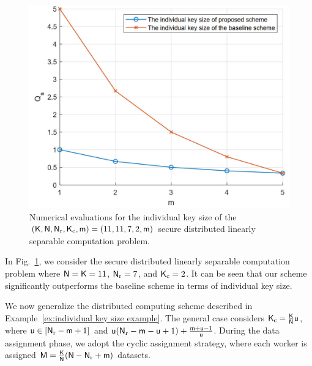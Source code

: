 \documentclass[conference,letterpaper]{IEEEtran}
\begin{document}
\begin{figure}%
\centerline{\includegraphics[scale=0.33]{compare}}
\caption{\small Numerical evaluations for the individual key size of the $({\sf K}, {\sf N}, {\sf N}_{\rm r}, {\sf K}_{\rm c}, {\sf m}) = (11, 11, 7, 2, {\sf m})$ secure distributed linearly separable computation problem.}
\label{fig: compare}
\end{figure}

In Fig.~\ref{fig: compare}, we consider the secure distributed linearly separable computation problem where ${\sf N} = {\sf K} = 11$, ${\sf N}_{\rm r} = 7$, and ${\sf K}_{\rm c}=2$.
It can be seen that our scheme significantly outperforms the baseline scheme in terms of individual key size.


We now generalize the distributed computing scheme described in Example~\ref{ex:individual key size example}. The general case considers ${\sf K}_{\rm c}= \frac{{\sf K}}{{\sf N}} {\sf u}$, where ${\sf u} \in [{\sf N}_{\rm r}-{\sf m}+1]$ and ${\sf u} ({\sf N}_{\rm r}-{\sf m}-{\sf u}+1) + \frac{{\sf m}+{\sf u}-1}{{\sf u}}$. 
During the data assignment phase, we adopt the cyclic assignment strategy, where each worker is assigned ${\sf M} = \frac{{\sf K}}{{\sf N}} ({\sf N} - {\sf N}_{\rm r} + {\sf m})$ datasets.
\end{document}
